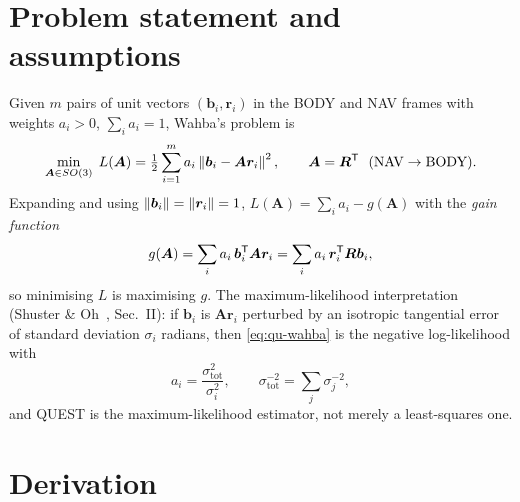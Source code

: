 \section{Problem statement and assumptions}
Given $m$ pairs of unit vectors $(\bm{b}_i,\bm{r}_i)$ in the BODY and NAV frames with weights
$a_i>0$, $\sum_i a_i=1$, Wahba's problem is
\begin{equation}
\min_{\bm{A}\in SO(3)}\; L(\bm{A}) = \tfrac12\sum_{i=1}^{m} a_i\left\lVert \bm{b}_i-\bm{A}\bm{r}_i \right\rVert^2,
\qquad \bm{A}=\bm{R}^{\mathsf{T}}\ \ (\text{NAV}\to\text{BODY}).
\label{eq:qu-wahba}
\end{equation}
Expanding and using $\left\lVert \bm{b}_i \right\rVert=\left\lVert \bm{r}_i \right\rVert=1$, $L(\bm{A})=\sum_i a_i - g(\bm{A})$ with the
\emph{gain function}
\begin{equation}
g(\bm{A}) = \sum_i a_i\,\bm{b}_i^{\mathsf{T}}\bm{A}\bm{r}_i = \sum_i a_i\,\bm{r}_i^{\mathsf{T}}\bm{R}\bm{b}_i ,
\label{eq:qu-gain}
\end{equation}
so minimising $L$ is maximising $g$. The maximum-likelihood interpretation
(Shuster \& Oh~\cite{shusteroh1981}, Sec.~II): if $\bm{b}_i$ is $\bm{A}\bm{r}_i$ perturbed by an
isotropic tangential error of standard deviation $\sigma_i$ radians, then \eqref{eq:qu-wahba} is the
negative log-likelihood with
\begin{equation}
a_i = \frac{\sigma_{\text{tot}}^2}{\sigma_i^2},\qquad
\sigma_{\text{tot}}^{-2}=\sum_j\sigma_j^{-2},
\label{eq:qu-weights}
\end{equation}
and QUEST is the maximum-likelihood estimator, not merely a least-squares one.

\section{Derivation}


